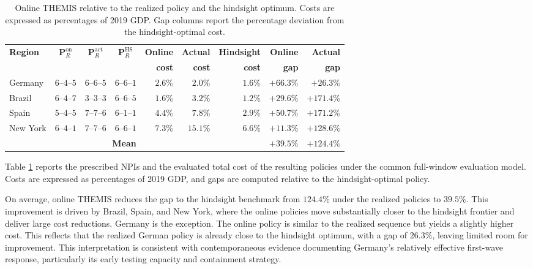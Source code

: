 \documentclass[msom,blindrev]{informs3} %
\newcommand{\rev}[1]{{\color{blue}#1}}
\begin{document}
{\begin{table}[htbp!]
\centering\footnotesize
\renewcommand{\arraystretch}{1.05}
\begin{tabular}{|l|c|c|c|r|r|r|r|r|}
\hline
\textbf{Region} & $\bm{P}_R^{\mathrm{on}}$ & $\bm{P}_R^{\mathrm{act}}$ & $\bm{P}_R^{\mathrm{HS}}$ & \textbf{Online} & \textbf{Actual} & \textbf{Hindsight} & \textbf{Online} & \textbf{Actual} \\
                &                          &                         &                     & \textbf{cost}   & \textbf{cost}   & \textbf{cost}      & \textbf{gap}    & \textbf{gap}   \\\hline
Germany   & $6$--$4$--$5$ & $6$--$6$--$5$ & $6$--$6$--$1$ & $2.6\%$  & $2.0\%$   & $1.6\%$  & $+66.3\%$ & $+26.3\%$ \\
Brazil    & $6$--$4$--$7$ & $3$--$3$--$3$ & $6$--$6$--$5$ & $1.6\%$   & $3.2\%$  & $1.2\%$  & $+29.6\%$ & $+171.4\%$ \\
Spain     & $5$--$4$--$5$ & $7$--$7$--$6$ & $6$--$1$--$1$ & $4.4\%$  & $7.8\%$  & $2.9\%$ & $+50.7\%$ & $+171.2\%$ \\
New York  & $6$--$4$--$1$ & $7$--$7$--$6$ & $6$--$6$--$1$ & $7.3\%$  & $15.1\%$  & $6.6\%$ & $+11.3\%$ & $+128.6\%$ \\\hline
\multicolumn{4}{|r|}{\textbf{Mean}} & & & & \textbf{$+39.5\%$} & \textbf{$+124.4\%$} \\\hline
\end{tabular}
\caption{\rev{Online THEMIS relative to the realized policy and the hindsight optimum. Costs are expressed as percentages of 2019 GDP. Gap columns report the percentage deviation from the hindsight-optimal cost.}}
\label{tab:rolling_advisor_v2}
\end{table}

Table \ref{tab:rolling_advisor_v2} reports the prescribed NPIs and the evaluated total cost of the resulting policies under the common full-window evaluation model. Costs are expressed as percentages of 2019 GDP, and gaps are computed relative to the hindsight-optimal policy.

On average, online THEMIS reduces the gap to the hindsight benchmark from $124.4\%$ under the realized policies to $39.5\%$. This improvement is driven by Brazil, Spain, and New York, where the online policies move substantially closer to the hindsight frontier and deliver large cost reductions. Germany is the exception. The online policy is similar to the realized sequence but yields a slightly higher cost. This reflects that the realized German policy is already close to the hindsight optimum, with a gap of $26.3\%$, leaving limited room for improvement. This interpretation is consistent with contemporaneous evidence documenting Germany’s relatively effective first-wave response, particularly its early testing capacity and containment strategy. 

}
\end{document}
